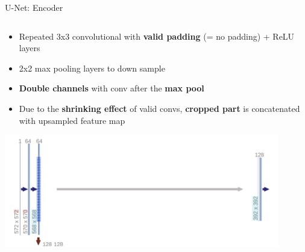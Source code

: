 \documentclass[serif, aspectratio=169]{beamer}
\begin{document}
\begin{frame}{U-Net: Encoder}
    \begin{columns}[T] %
    
        \begin{column}{0.7\textwidth}
            \begin{itemize}
            \scriptsize
                \item Repeated 3x3 convolutional with \textbf{\textcolor{red!60!black}{valid padding}} (= no padding) + ReLU layers
                \item 2x2 max pooling layers to down sample
                \item \textbf{\textcolor{yellow!60!black}{Double channels}} with conv after the \textbf{\textcolor{green!60!black}{max pool}}
                \item Due to the \textbf{\textcolor{blue!60!black}{shrinking effect}} of valid convs, \textbf{\textcolor{cyan!60!black}{cropped part}} is concatenated with upsampled feature map
            \end{itemize}
            \begin{center}
                \hspace{0.5cm} %
                \includegraphics[width=0.9\textwidth]{pic/Unet-Encoder2.png}
            \end{center}
        \end{column}
        

\end{columns}
\end{frame}
\end{document}
